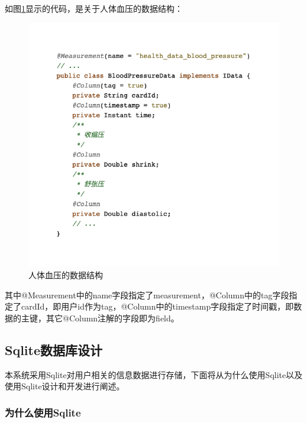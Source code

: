 \documentclass[oneside]{xduugthesis}
\begin{document}
如图\ref{fig:influx-object}显示的代码，是关于人体血压的数据结构：

\begin{figure}[htb]
    \centering
    \includegraphics[width=0.8\linewidth]{images/code-object.jpeg}
    \caption{人体血压的数据结构}
    \label{fig:influx-object}
\end{figure}


其中@Measurement中的name字段指定了measurement，@Column中的tag字段指定了cardId，即用户id作为tag，@Column中的timestamp字段指定了时间戳，即数据的主键，其它@Column注解的字段即为field。

\subsection{Sqlite数据库设计}

本系统采用Sqlite对用户相关的信息数据进行存储，下面将从为什么使用Sqlite以及使用Sqlite设计和开发进行阐述。

\subsubsection{为什么使用Sqlite}
\end{document}
